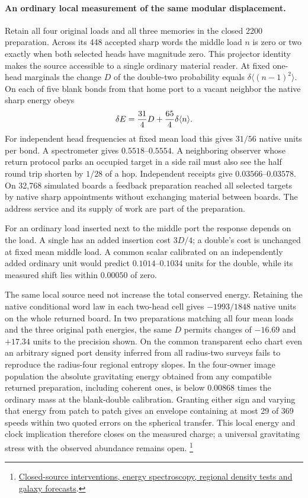 \documentclass[11pt]{article}
\begin{document}
\paragraph{An ordinary local measurement of the same modular displacement.}
Retain all four original loads and all three memories in the closed
2200 preparation. Across its 448 accepted sharp words the middle load
\(n\) is zero or two exactly when both selected heads have magnitude
zero. This projector identity makes the source accessible to a single
ordinary material reader. At fixed one-head marginals the change \(D\)
of the double-two probability equals \(\delta\langle(n-1)^2\rangle\).
On each of five blank bonds from that home port to a vacant neighbor
the native sharp energy obeys
\[
 \delta E={31\over4}D+{65\over4}\delta\langle n\rangle .
\]
For independent head frequencies at fixed mean load this gives
\(31/56\) native units per bond. A spectrometer gives \(0.5518\)--\(0.5554\).
A neighboring observer whose return protocol parks an occupied target
in a side rail must also see the half round trip shorten by \(1/28\)
of a hop. Independent receipts give \(0.03566\)--\(0.03578\).
On 32,768 simulated boards a feedback preparation reached all selected
targets by native sharp appointments without exchanging material
between boards. The address service and its supply of work are part
of the preparation.

For an ordinary load inserted next to the middle port the response
depends on the load. A single has an added insertion cost \(3D/4\);
a double's cost is unchanged at fixed mean middle load. A common scalar
calibrated on an independently added ordinary unit would predict
\(0.1014\)--\(0.1034\) units for the double, while its measured shift
lies within \(0.00050\) of zero.

The same local source need not increase the total conserved energy.
Retaining the native conditional word law in each two-head cell gives
\(-1993/1848\) native units on the whole returned board. In two
preparations matching all four mean loads and the three original
path energies, the same \(D\) permits changes of \(-16.69\) and \(+17.34\)
units to the precision shown. On the common transparent echo chart even
an arbitrary signed port density inferred from all radius-two surveys
fails to reproduce the radius-four regional entropy slopes. In the
four-owner image population the absolute gravitating energy obtained
from any compatible returned preparation, including coherent ones,
is below \(0.00868\) times the ordinary mass at the blank-double
calibration. Granting either sign and varying that energy from patch
to patch gives an envelope containing at most 29 of 369 speeds
within two quoted errors on the spherical transfer. This local energy
and clock implication therefore closes on the measured charge;
a universal gravitating stress with the observed abundance remains
open.%
\footnote{\href{https://github.com/FloatingPragma/observer-patch-holography/blob/main/model/experiments/interval_echo_shell_flux/product_address/green_response/material_recoil/overlap_source/native_boundary/stock/aperture/CLOSED_SOURCE_RESULTS.md}{Closed-source interventions, energy spectroscopy, regional density tests and galaxy forecasts}.}
\end{document}
